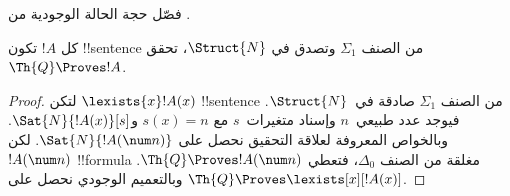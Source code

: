 \documentclass[../../../include/open-logic-section]{subfiles}
\begin{document}
\begin{prob}
فصّل حجة الحالة الوجودية من
.
\end{prob}

\begin{thm}
كل $!A$ تكون !!{sentence} من الصنف $\Sigma_1$ وتصدق في
$\Struct{N}$، تحقق $\Th{Q}\Proves !A$.
\end{thm}

\begin{proof}
لتكن $\lexists{x}!A(x)$ !!{sentence} من الصنف $\Sigma_1$
صادقة في~$\Struct{N}$. فيوجد عدد طبيعي~$n$ وإسناد متغيرات~$s$
مع $s(x)=n$ و$\Sat{N}{!A(x)}[s]$.
وبالخواص المعروفة لعلاقة التحقيق نحصل على
$\Sat{N}{!A(\num n)}$.
لكن $!A(\num n)$ !!{formula} مغلقة من الصنف $\Delta_0$،
فتعطي 
$\Th{Q}\Proves !A(\num n)$.
وبالتعميم الوجودي نحصل على
$\Th{Q}\Proves\lexists[x][!A(x)]$.
\end{proof}
\end{document}
